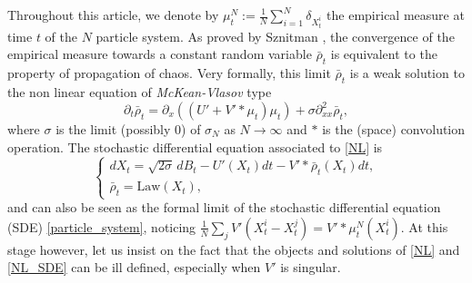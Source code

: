 \documentclass[10pt]{amsart}
\theoremstyle{plain}
\theoremstyle{definition}
\begin{document}
Throughout this article, we denote by $\mu^N_t:=\frac{1}{N}\sum_{i=1}^N\delta_{X^i_t}$ the empirical measure at time $t$ of the $N$ particle system. As proved by Sznitman \cite{Saint_Flour_1991}, the convergence of the empirical measure towards a constant random variable $\bar{\rho}_t$ is equivalent to the property of propagation of chaos. Very formally, this limit $\bar{\rho}_t$ is a weak solution to the non linear equation of \textit{McKean-Vlasov} type
\begin{equation}\label{NL}
\partial_t \bar{\rho}_t=\partial_x\left(\left(U'+V'\ast\mu_t\right)\mu_t\right)+\sigma \partial^2_{xx}\bar{\rho}_t,
\end{equation}
where $\sigma$ is the limit (possibly $0$) of $\sigma_N$ as $N\to\infty$ and $\ast$ is the (space) convolution operation. The stochastic differential equation associated to \eqref{NL} is
\begin{equation}\label{NL_SDE}
\begin{cases}
dX_t=\sqrt{2\sigma}\,dB_t-U'(X_t)dt-V'\ast\bar{\rho}_t(X_t)dt,\\
\bar{\rho}_t=\text{Law}(X_t),
\end{cases}
\end{equation}
and can also be seen as the formal limit of the stochastic differential equation (SDE) \eqref{particle_system}, noticing $\frac{1}{N}\sum_{j}V'(X^i_t-X^j_t)=V'\ast\mu^N_t(X^i_t).$ At this stage however, let us insist on the fact that the objects and solutions of \eqref{NL} and \eqref{NL_SDE} can be ill defined, especially when $V'$ is singular.
\end{document}
